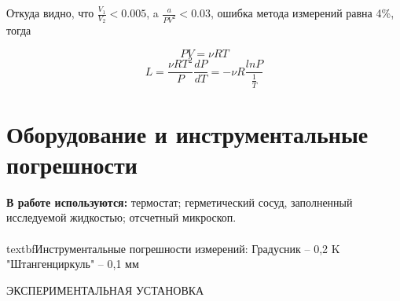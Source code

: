  Откуда видно, что $\frac{V_1}{V_2} < 0.005$, a $\frac{a}{PV^2}<0.03$, ошибка метода измерений равна 4\%, тогда
 
 \begin{equation*}
PV=\nu RT
\end{equation*}
\begin{equation*}
L=\frac{\nu RT^2}{P}\frac{dP}{dT} = -\nu R\frac{lnP}{\frac{1}{T}}
\end{equation*}

\section{Оборудование и инструментальные погрешности}

\textbf{В работе используются:} термостат; герметический сосуд, заполненный исследуемой жидкостью; отсчетный микроскоп.\\
\\textbf{Инструментальные погрешности измерений:}
Градусник -- 0,2 K\\
"Штангенциркуль" -- 0,1 мм\\


\begin{center}
ЭКСПЕРИМЕНТАЛЬНАЯ УСТАНОВКА
\end{center}


